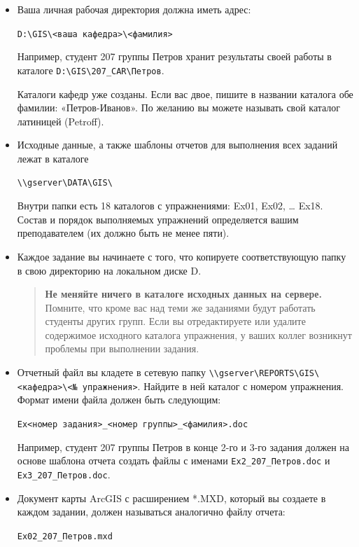 \documentclass[]{book}
\theoremstyle{definition}
\theoremstyle{definition}
\theoremstyle{definition}
\theoremstyle{remark}
\begin{document}
\begin{itemize}
\item
  Ваша личная рабочая директория должна иметь адрес:

  \texttt{D:\textbackslash{}GIS\textbackslash{}\textless{}ваша\ кафедра\textgreater{}\textbackslash{}\textless{}фамилия\textgreater{}}

  Например, студент 207 группы Петров хранит результаты своей работы в
  каталоге
  \texttt{D:\textbackslash{}GIS\textbackslash{}207\_CAR\textbackslash{}Петров}.

  Каталоги кафедр уже созданы. Если вас двое, пишите в названии каталога
  обе фамилии: «Петров-Иванов». По желанию вы можете называть свой
  каталог латиницей (Petroff).
\item
  Исходные данные, а также шаблоны отчетов для выполнения всех заданий
  лежат в каталоге

  \texttt{\textbackslash{}\textbackslash{}gserver\textbackslash{}DATA\textbackslash{}GIS\textbackslash{}}

  Внутри папки есть 18 каталогов с упражнениями: Ex01, Ex02, \ldots{}
  Ex18. Состав и порядок выполняемых упражнений определяется вашим
  преподавателем (их должно быть не менее пяти).
\item
  Каждое задание вы начинаете с того, что копируете соответствующую
  папку в свою директорию на локальном диске D.

  \begin{quote}
  \textbf{Не меняйте ничего в каталоге исходных данных на сервере.}
  Помните, что кроме вас над теми же заданиями будут работать студенты
  других групп. Если вы отредактируете или удалите содержимое исходного
  каталога упражнения, у ваших коллег возникнут проблемы при выполнении
  задания.
  \end{quote}
\item
  Отчетный файл вы кладете в сетевую папку
  \texttt{\textbackslash{}\textbackslash{}gserver\textbackslash{}REPORTS\textbackslash{}GIS\textbackslash{}\textless{}кафедра\textgreater{}\textbackslash{}\textless{}№\ упражнения\textgreater{}}.
  Найдите в ней каталог с номером упражнения. Формат имени файла должен
  быть следующим:

  \texttt{Ex\textless{}номер\ задания\textgreater{}\_\textless{}номер\ группы\textgreater{}\_\textless{}фамилия\textgreater{}.doc}

  Например, студент 207 группы Петров в конце 2-го и 3-го задания должен
  на основе шаблона отчета создать файлы с именами
  \texttt{Ex2\_207\_Петров.doc} и \texttt{Ex3\_207\_Петров.doc}.
\item
  Документ карты ArcGIS с расширением *.MXD, который вы создаете в
  каждом задании, должен называться аналогично файлу отчета:

  \texttt{Ex02\_207\_Петров.mxd}
\end{itemize}
\end{document}
